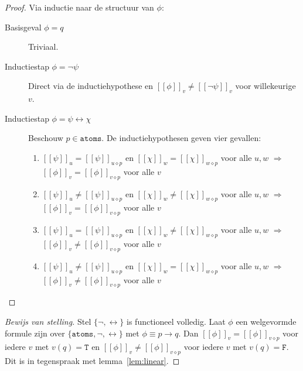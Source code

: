 \documentclass[a4paper,11pt]{article}
\begin{document}
\begin{proof}
  Via inductie naar de structuur van $\phi$:

  \begin{description}
  \item[Basisgeval $\phi = q$]\hfill

    Triviaal.

  \item[Inductiestap $\phi = \neg \psi$]\hfill

    Direct via de inductiehypothese en $[\![ \phi ]\!]_{v} \neq [\![ \neg \psi ]\!]_{v}$
    voor willekeurige $v$.

  \item[Inductiestap $\phi = \psi \leftrightarrow \chi$]\hfill

    Beschouw $p \in \mathtt{atoms}$. De inductiehypothesen geven vier gevallen:
    \begin{enumerate}
      \item $[\![ \psi ]\!]_{u} = [\![ \psi ]\!]_{u \diamond p}$ en $[\![ \chi ]\!]_{w} = [\![ \chi ]\!]_{w \diamond p}$ voor alle $u,w$
        $\Rightarrow$
        $[\![ \phi ]\!]_{v} = [\![ \phi ]\!]_{v \diamond p}$ voor alle $v$
      \item $[\![ \psi ]\!]_{u} \neq [\![ \psi ]\!]_{u \diamond p}$ en $[\![ \chi ]\!]_{w} \neq [\![ \chi ]\!]_{w \diamond p}$ voor alle $u,w$
        $\Rightarrow$
        $[\![ \phi ]\!]_{v} = [\![ \phi ]\!]_{v \diamond p}$ voor alle $v$
      \item $[\![ \psi ]\!]_{u} = [\![ \psi ]\!]_{u \diamond p}$ en $[\![ \chi ]\!]_{w} \neq [\![ \chi ]\!]_{w \diamond p}$ voor alle $u,w$
        $\Rightarrow$
        $[\![ \phi ]\!]_{v} \neq [\![ \phi ]\!]_{v \diamond p}$ voor alle $v$
      \item $[\![ \psi ]\!]_{u} \neq [\![ \psi ]\!]_{u \diamond p}$ en $[\![ \chi ]\!]_{w} = [\![ \chi ]\!]_{w \diamond p}$ voor alle $u,w$
        $\Rightarrow$
        $[\![ \phi ]\!]_{v} \neq [\![ \phi ]\!]_{v \diamond p}$ voor alle $v$\qedhere
    \end{enumerate}
\end{description}
\end{proof}

\begin{proof}[Bewijs van stelling]
  Stel $\{\neg, \leftrightarrow\}$ is functioneel volledig.
  Laat $\phi$ een welgevormde formule zijn over $\{\mathtt{atoms}, \neg, \leftrightarrow\}$
  met $\phi \equiv p \rightarrow q$. Dan $[\![ \phi ]\!]_{v} = [\![ \phi ]\!]_{v \diamond p}$
  voor iedere $v$ met $v(q) = \mathtt{T}$ en
  $[\![ \phi ]\!]_{v} \neq [\![ \phi ]\!]_{v \diamond p}$
  voor iedere $v$ met $v(q) = \mathtt{F}$.
  Dit is in tegenspraak met lemma~\ref{lem:linear}.
\end{proof}
\end{document}
